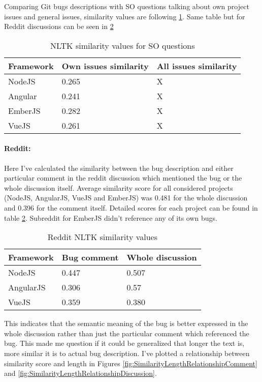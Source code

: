 Comparing Git bugs descriptions with SO questions talking about own project issues and general issues, similarity values are following \ref{table:StackOverflowNLTKsimilarity}. Same table but for Reddit discussions can be seen in \ref{table:RedditNLTKsimilarity}

\begin{table}[H]
\centering
\begin{tabular}{ |p{3cm}||p{5cm}|p{5cm}|}
 \hline
\textbf{ Framework }& \textbf{Own issues similarity}& \textbf{All issues similarity}\\
 \hline
 NodeJS   & 0.265 & X\\ \hline
 Angular & 0.241 & X\\ \hline
 EmberJS & 0.282 & X\\ \hline 
 VueJS &   0.261 & X\\ \hline
\end{tabular}
\caption{NLTK similarity values for SO questions}
\label{table:StackOverflowNLTKsimilarity}
\end{table}

\paragraph{Reddit:}
Here I've calculated the similarity between the bug description and either particular comment in the reddit discussion which mentioned the bug or the whole discussion itself. Average similarity score for all considered projects (NodeJS, AngularJS, VueJS and EmberJS) was 0.481 for the whole discussion and 0.396 for the comment itself. Detailed scores for each project can be found in table \ref{table:RedditNLTKsimilarity}. Subreddit for EmberJS didn't reference any of its own bugs.

\begin{table}[H]
\centering
\begin{tabular}{ |p{3cm}||p{3cm}|p{4cm}|}
 \hline
\textbf{ Framework }& \textbf{Bug comment}& \textbf{Whole discussion}\\
 \hline
 NodeJS   & 0.447 & 0.507\\ \hline 
 AngularJS & 0.306 & 0.57 \\ \hline 
 VueJS &   0.359 & 0.380\\ \hline
\end{tabular}
\caption{Reddit NLTK similarity values}
\label{table:RedditNLTKsimilarity}
\end{table}

This indicates that the semantic meaning of the bug is better expressed in the whole discussion rather than just the particular comment which referenced the bug. This made me question if it could be generalized that longer the text is, more similar it is to actual bug description. I've plotted a relationship between similarity score and length in Figures \ref{fig:SimilarityLengthRelationshipComment} and \ref{fig:SimilarityLengthRelationshipDiscussion}.

